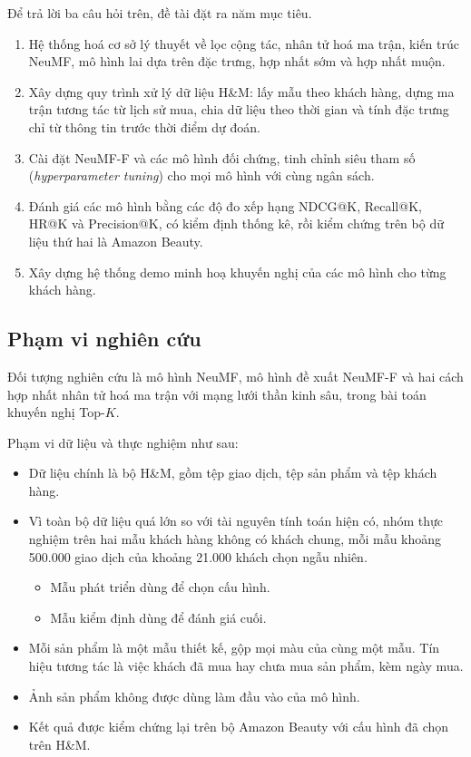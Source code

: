 Để trả lời ba câu hỏi trên, đề tài đặt ra năm mục tiêu.
\begin{enumerate}[label=(\arabic*), leftmargin=*]
    \item Hệ thống hoá cơ sở lý thuyết về lọc cộng tác, nhân tử hoá ma trận, kiến trúc NeuMF, mô hình lai dựa trên đặc trưng, hợp nhất sớm và hợp nhất muộn.
    \item Xây dựng quy trình xử lý dữ liệu H\&M: lấy mẫu theo khách hàng, dựng ma trận tương tác từ lịch sử mua, chia dữ liệu theo thời gian và tính đặc trưng chỉ từ thông tin trước thời điểm dự đoán.
    \item Cài đặt NeuMF-F và các mô hình đối chứng, tinh chỉnh siêu tham số (\textit{hyperparameter tuning}) cho mọi mô hình với cùng ngân sách.
    \item Đánh giá các mô hình bằng các độ đo xếp hạng NDCG@K, Recall@K, HR@K và Precision@K, có kiểm định thống kê, rồi kiểm chứng trên bộ dữ liệu thứ hai là Amazon Beauty.
    \item Xây dựng hệ thống demo minh hoạ khuyến nghị của các mô hình cho từng khách hàng.
\end{enumerate}

\subsection{Phạm vi nghiên cứu}
\label{subsec:phamvi}

Đối tượng nghiên cứu là mô hình NeuMF, mô hình đề xuất NeuMF-F và hai cách hợp nhất nhân tử hoá ma trận với mạng lưới thần kinh sâu, trong bài toán khuyến nghị Top-$K$.

Phạm vi dữ liệu và thực nghiệm như sau:
\begin{itemize}
    \item Dữ liệu chính là bộ H\&M, gồm tệp giao dịch, tệp sản phẩm và tệp khách hàng.
    \item Vì toàn bộ dữ liệu quá lớn so với tài nguyên tính toán hiện có, nhóm thực nghiệm trên hai mẫu khách hàng không có khách chung, mỗi mẫu khoảng 500.000 giao dịch của khoảng 21.000 khách chọn ngẫu nhiên.
    \begin{itemize}
        \item Mẫu phát triển dùng để chọn cấu hình.
        \item Mẫu kiểm định dùng để đánh giá cuối.
    \end{itemize}
    \item Mỗi sản phẩm là một mẫu thiết kế, gộp mọi màu của cùng một mẫu. Tín hiệu tương tác là việc khách đã mua hay chưa mua sản phẩm, kèm ngày mua.
    \item Ảnh sản phẩm không được dùng làm đầu vào của mô hình.
    \item Kết quả được kiểm chứng lại trên bộ Amazon Beauty với cấu hình đã chọn trên H\&M.
\end{itemize}

